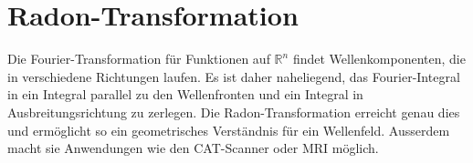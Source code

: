 %
%
%
\chapter{Radon-Transformation
\label{buch:chapter:radon}}
Die Fourier-Transformation für Funktionen auf $\mathbb{R}^n$ findet
Wellenkomponenten, die in verschiedene Richtungen laufen. 
Es ist daher naheliegend, das Fourier-Integral in
ein Integral parallel zu den Wellenfronten und ein Integral in 
Ausbreitungsrichtung zu zerlegen.
Die Radon-Transformation erreicht genau dies und ermöglicht so
ein geometrisches Verständnis für ein Wellenfeld.
Ausserdem macht sie Anwendungen wie den CAT-Scanner oder 
MRI möglich.






